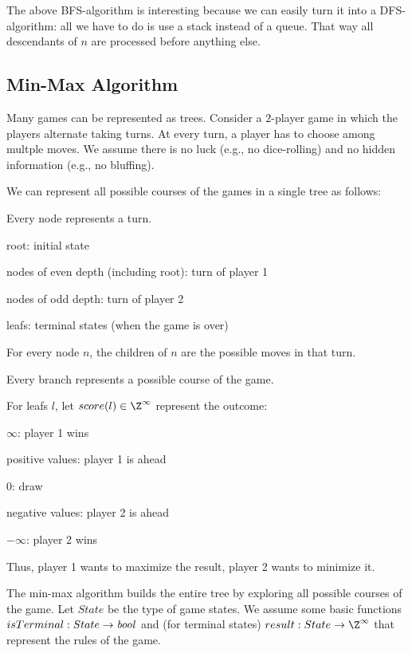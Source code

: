 The above BFS-algorithm is interesting because we can easily turn it into a DFS-algorithm: all we have to do is use a stack instead of a queue.
That way all descendants of $n$ are processed before anything else.

\subsection{Min-Max Algorithm}

Many games can be represented as trees.
Consider a $2$-player game in which the players alternate taking turns.
At every turn, a player has to choose among multple moves.
We assume there is no luck (e.g., no dice-rolling) and no hidden information (e.g., no bluffing).

We can represent all possible courses of the games in a single tree as follows:
\begin{compactitem}
 \item Every node represents a turn.
  \begin{compactitem}
    \item root: initial state
    \item nodes of even depth (including root): turn of player 1
    \item nodes of odd depth: turn of player 2
    \item leafs: terminal states (when the game is over)
  \end{compactitem}
 \item For every node $n$, the children of $n$ are the possible moves in that turn.
 \item Every branch represents a possible course of the game.
\end{compactitem}

For leafs $l$, let $score(l)\in\Z^\infty$ represent the outcome:
\begin{compactitem}
 \item $\infty$: player 1 wins
 \item positive values: player 1 is ahead
 \item $0$: draw
 \item negative values: player 2 is ahead
 \item $-\infty$: player 2 wins
\end{compactitem}
Thus, player 1 wants to maximize the result, player 2 wants to minimize it.

The min-max algorithm builds the entire tree by exploring all possible courses of the game.
Let $State$ be the type of game states.
We assume some basic functions $isTerminal:State\to\mathit{bool}$ and (for terminal states) $result:State\to\Z^\infty$ that represent the rules of the game.


